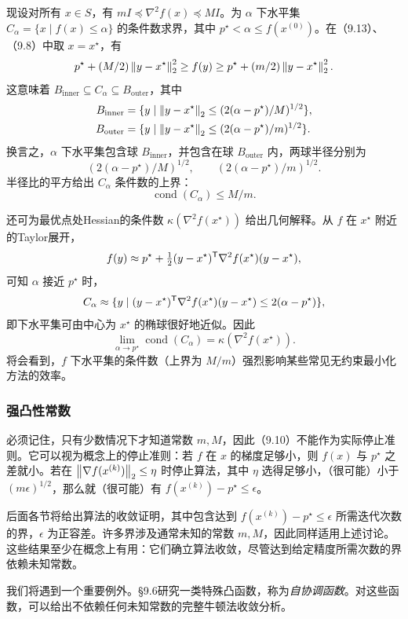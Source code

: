 现设对所有 $x\in S$，有 $mI\preceq\nabla^2f(x)\preceq MI$。为 $\alpha$ 下水平集 $C_\alpha=\{x\mid f(x)\le\alpha\}$ 的条件数求界，其中 $p^\star<\alpha\le f(x^{(0)})$。在（9.13）、（9.8）中取 $x=x^\star$，有
\[
p^\star+(M/2)\left\lVert y-x^\star\right\rVert_2^2\ge f(y)
\ge p^\star+(m/2)\left\lVert y-x^\star\right\rVert_2^2.
\]
这意味着 $B_{\mathrm{inner}}\subseteq C_\alpha\subseteq B_{\mathrm{outer}}$，其中
\[
\begin{aligned}
B_{\mathrm{inner}}&=\{y\mid\left\lVert y-x^\star\right\rVert_2\le(2(\alpha-p^\star)/M)^{1/2}\},\\
B_{\mathrm{outer}}&=\{y\mid\left\lVert y-x^\star\right\rVert_2\le(2(\alpha-p^\star)/m)^{1/2}\}.
\end{aligned}
\]
换言之，$\alpha$ 下水平集包含球 $B_{\mathrm{inner}}$，并包含在球 $B_{\mathrm{outer}}$ 内，两球半径分别为
\[
(2(\alpha-p^\star)/M)^{1/2},\qquad(2(\alpha-p^\star)/m)^{1/2}.
\]
半径比的平方给出 $C_\alpha$ 条件数的上界：
\[
\operatorname{cond}(C_\alpha)\le M/m.
\]

还可为最优点处Hessian的条件数 $\kappa(\nabla^2f(x^\star))$ 给出几何解释。从 $f$ 在 $x^\star$ 附近的Taylor展开，
\[
f(y)\approx p^\star+\tfrac12(y-x^\star)^\mathsf T\nabla^2f(x^\star)(y-x^\star),
\]
可知 $\alpha$ 接近 $p^\star$ 时，
\[
C_\alpha\approx\{y\mid(y-x^\star)^\mathsf T\nabla^2f(x^\star)(y-x^\star)
\le2(\alpha-p^\star)\},
\]
即下水平集可由中心为 $x^\star$ 的椭球很好地近似。因此
\[
\lim_{\alpha\to p^\star}\operatorname{cond}(C_\alpha)=\kappa(\nabla^2f(x^\star)).
\]
将会看到，$f$ 下水平集的条件数（上界为 $M/m$）强烈影响某些常见无约束最小化方法的效率。

\subsubsection*{强凸性常数}
必须记住，只有少数情况下才知道常数 $m,M$，因此（9.10）不能作为实际停止准则。它可以视为概念上的停止准则：若 $f$ 在 $x$ 的梯度足够小，则 $f(x)$ 与 $p^\star$ 之差就小。若在 $\left\lVert \nabla f(x^{(k)})\right\rVert_2\le\eta$ 时停止算法，其中 $\eta$ 选得足够小，（很可能）小于 $(m\epsilon)^{1/2}$，那么就（很可能）有 $f(x^{(k)})-p^\star\le\epsilon$。

后面各节将给出算法的收敛证明，其中包含达到 $f(x^{(k)})-p^\star\le\epsilon$ 所需迭代次数的界，$\epsilon$ 为正容差。许多界涉及通常未知的常数 $m,M$，因此同样适用上述讨论。这些结果至少在概念上有用：它们确立算法收敛，尽管达到给定精度所需次数的界依赖未知常数。

我们将遇到一个重要例外。§9.6研究一类特殊凸函数，称为\emph{自协调函数}。对这些函数，可以给出不依赖任何未知常数的完整牛顿法收敛分析。

